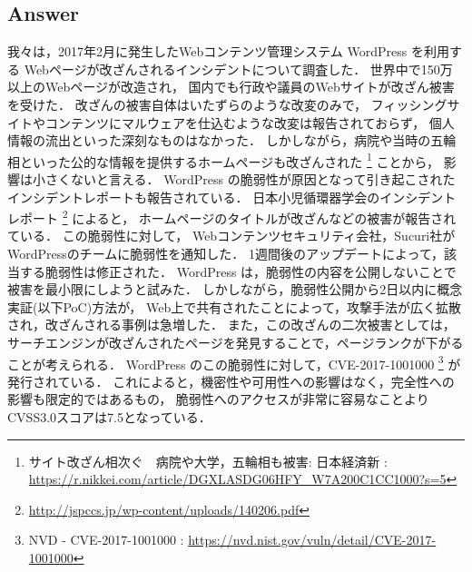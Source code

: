 \documentclass[uplatex]{jsarticle}
\begin{document}
\subsection*{Answer}
我々は，2017年2月に発生したWebコンテンツ管理システム WordPress を利用する
Webページが改ざんされるインシデントについて調査した．
世界中で150万以上のWebページが改造され，
国内でも行政や議員のWebサイトが改ざん被害を受けた．
改ざんの被害自体はいたずらのような改変のみで，
フィッシングサイトやコンテンツにマルウェアを仕込むような改変は報告されておらず，
個人情報の流出といった深刻なものはなかった．
しかしながら，病院や当時の五輪相といった公的な情報を提供するホームページも改ざんされた
\footnote{
    サイト改ざん相次ぐ　病院や大学，五輪相も被害: 日本経済新
    : \url{https://r.nikkei.com/article/DGXLASDG06HFY_W7A200C1CC1000?s=5}
}
ことから，
影響は小さくないと言える．
WordPress の脆弱性が原因となって引き起こされたインシデントレポートも報告されている．
日本小児循環器学会のインシデントレポート
\footnote{\url{http://jspccs.jp/wp-content/uploads/140206.pdf}}
によると，
ホームページのタイトルが改ざんなどの被害が報告されている．
この脆弱性に対して，
Webコンテンツセキュリティ会社，Sucuri社がWordPressのチームに脆弱性を通知した．
1週間後のアップデートによって，該当する脆弱性は修正された．
WordPress は，脆弱性の内容を公開しないことで被害を最小限にしようと試みた．
しかしながら，脆弱性公開から2日以内に概念実証(以下PoC)方法が，
Web上で共有されたことによって，攻撃手法が広く拡散され，改ざんされる事例は急増した．
また，この改ざんの二次被害としては，
サーチエンジンが改ざんされたページを発見することで，ページランクが下がることが考えられる．
WordPress のこの脆弱性に対して，CVE-2017-1001000
\footnote{
    NVD - CVE-2017-1001000
    : \url{https://nvd.nist.gov/vuln/detail/CVE-2017-1001000}
}
が発行されている．
これによると，機密性や可用性への影響はなく，完全性への影響も限定的ではあるもの，
脆弱性へのアクセスが非常に容易なことよりCVSS3.0スコアは7.5となっている．
\end{document}
